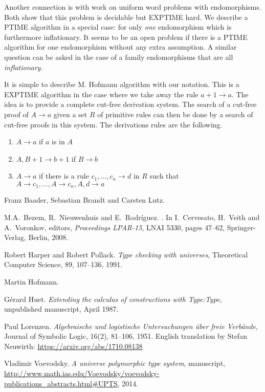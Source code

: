 \documentclass[11pt,a4paper]{article}
\begin{document}
Another connection is with work on uniform word problems with
endomorphisms. Both \cite{Baader,Hofmann} show that this problem is decidable
but EXPTIME hard. We describe a PTIME algorithm in a special case: for
only {\em one} endomorphism which is furthermore inflationary.
It seems to be an open problem if there is a PTIME algorithm for
one endomorphism without any extra assumption. A similar
question can be asked in the case of a family endomorphisms
that are all {\em inflationary}.

It is simple to describe M. Hofmann \cite{Hofmann} algorithm with
our notation. This is a EXPTIME algorithm in the case where
we take away the rule $a+1\to a$. The idea is to provide a complete cut-free
derivation system. The search of a cut-free
proof of $A\to a$ given a set $R$ of primitive rules can then be done by a search of cut-free
proofs in this system. The derivations rules are the following.

\begin{enumerate}
\item $A\to a$ if $a$ is in $A$
\item $A,B+1\to b+1$ if $B\to b$
\item $A\to a$ if there is a rule $c_1,\dots,c_n\to d$ in $R$ such that 
  $A\to c_1,\dots,A\to c_n,A,d\to a$
\end{enumerate}






\begin{thebibliography}{99}

  Franz Baader, Sebastian Brandt and Carsten Lutz.

M.A.~Bezem, R.~Nieuwenhuis and E.~Rodr\'iguez.
.
In I.~Cervesato, H.~Veith and A.~Voronkov, editors,
\emph{Proceedings LPAR-15}, LNAI 5330,
pages 47--62, Springer-Verlag, Berlin, 2008.

Robert Harper and Robert Pollack.
\newblock\emph{Type checking with universes},
Theoretical Computer Science, 89, 107--136, 1991.

  Martin Hofmann.

G\'erard Huet.
\newblock\emph{Extending the calculus of constructions with {Type:Type}},
\newblock unpublished manuscript, April 1987.

Paul Lorenzen.
  \newblock\emph{Algebraische und logistische Untersuchungen über freie Verbände},
Journal of Symbolic Logic, 16(2), 81--106, 1951.
English translation by Stefan Neuwirth: \url{https://arxiv.org/abs/1710.08138}

  Vladimir Voevodsky.
 \newblock\emph{A universe polymorphic type system},
manuscript, 
 \newblock \url{http://www.math.ias.edu/Voevodsky/voevodsky-publications_abstracts.html\#UPTS}, {2014}.



\end{thebibliography}
\end{document}
